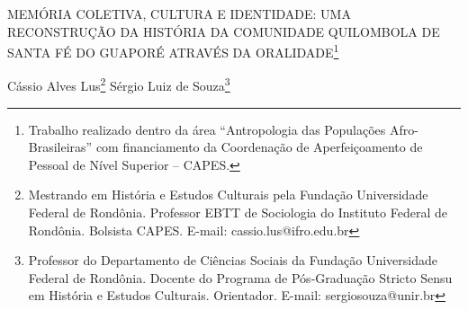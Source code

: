 \documentclass[article,12pt,onesidea,4paper,english,brazil]{abntex2}
\begin{document}
	
	
	\frenchspacing 
	
	\begin{center}
		\LARGE MEMÓRIA COLETIVA, CULTURA E IDENTIDADE: UMA RECONSTRUÇÃO DA
		HISTÓRIA DA COMUNIDADE QUILOMBOLA DE SANTA FÉ DO GUAPORÉ ATRAVÉS DA ORALIDADE\footnote{Trabalho realizado dentro da área “Antropologia das Populações Afro-Brasileiras” com financiamento da Coordenação de Aperfeiçoamento de Pessoal de Nível Superior – CAPES.}
		
		\normalsize
		Cássio Alves Lus\footnote{Mestrando em História e Estudos Culturais pela Fundação Universidade Federal de Rondônia. Professor EBTT de Sociologia do Instituto Federal de Rondônia. Bolsista CAPES. E-mail: cassio.lus@ifro.edu.br} 
		Sérgio Luiz de Souza\footnote{Professor do Departamento de Ciências Sociais da Fundação Universidade Federal de Rondônia. Docente do Programa de Pós-Graduação Stricto Sensu em História e Estudos Culturais. Orientador. E-mail: sergiosouza@unir.br}  
	\end{center}
	
\end{document}
